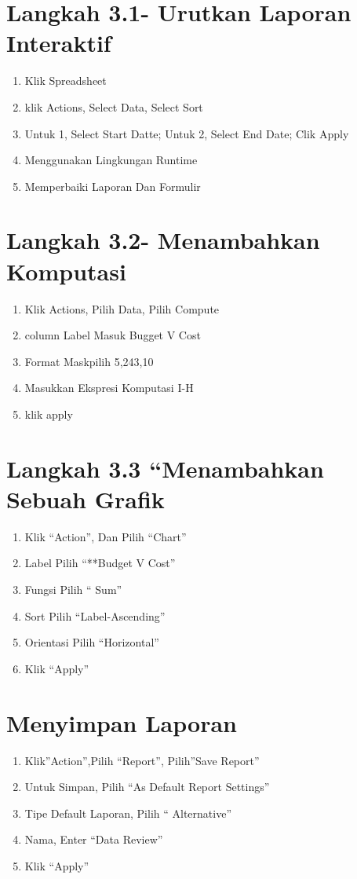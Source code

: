 \documentclass{article}
\begin{document}
\section{Langkah 3.1-  Urutkan Laporan Interaktif}
\begin{enumerate}
    \item Klik Spreadsheet
    \item klik Actions, Select Data, Select Sort
    \item Untuk 1, Select Start Datte; Untuk 2, Select End Date; Clik Apply
    \item Menggunakan Lingkungan Runtime
    \item Memperbaiki Laporan Dan Formulir

\end{enumerate}

\section{Langkah 3.2- Menambahkan Komputasi}
    \begin{enumerate}
    \item Klik Actions, Pilih Data, Pilih Compute
    \item column Label Masuk Bugget V Cost
    \item Format Maskpilih 5,243,10
    \item Masukkan Ekspresi Komputasi I-H
    \item klik apply

    \end{enumerate}
\section {Langkah 3.3 “Menambahkan Sebuah Grafik}
\begin{enumerate}
    \item Klik “Action”, Dan Pilih “Chart”
\item Label Pilih “**Budget V Cost”
\item Fungsi Pilih “ Sum”
\item Sort Pilih “Label-Ascending”
\item Orientasi Pilih “Horizontal”
\item Klik “Apply”
\end{enumerate}
\usepackage{*NB: Untuk Pengeditan Grafik Bias Dilakukan Dilaman App From Spreadsheet}
\section{Menyimpan Laporan}
\begin{enumerate}
    \item Klik”Action”,Pilih “Report”, Pilih”Save Report”
    \item Untuk Simpan, Pilih “As Default Report Settings”
    \item Tipe Default Laporan, Pilih “ Alternative”
    \item Nama, Enter “Data Review”
    \item Klik “Apply”

\end{enumerate}
\end{document}
